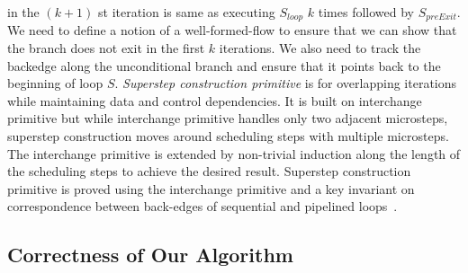 in the $(k+1)$ st iteration is same as executing $S_{loop}$ $k$ times followed by $S_{preExit}$. 
We need to define a notion of a well-formed-flow to ensure that we can show that the 
branch does not exit in the first $k$ iterations. We also need to track the backedge along the 
unconditional branch and ensure that it points back to the beginning of loop $S$.
 {\em Superstep construction primitive} is for overlapping iterations while 
maintaining data and control dependencies. It is built on interchange primitive but while interchange primitive
handles only two adjacent microsteps, superstep construction moves around scheduling steps with multiple microsteps. 
The interchange primitive is extended by non-trivial induction along the length of the scheduling steps to achieve the desired result. 
Superstep construction primitive is proved using the interchange primitive and a key invariant 
on correspondence between back-edges of sequential and pipelined loops~\cite{disha-itp14}. 

\subsection{Correctness of Our Algorithm}

  

